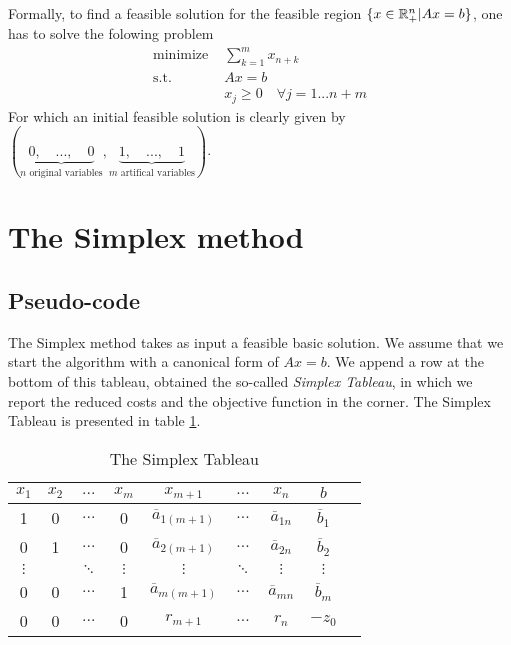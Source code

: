 Formally, to find a feasible solution for the feasible region  $\{ x\in\mathbb R^n_+ | Ax = b \}$, one has to solve the folowing problem 
\begin{align*}
    \textrm{minimize } & \sum_{k=1}^m x_{n+k}\\
    \textrm{s.t. } & Ax = b\\
    & x_j \ge 0\quad\forall j=1...n+m
\end{align*}
For which an initial feasible solution is clearly given by $(\underbrace{0,\quad...,\quad0}_{n\textrm{ original variables}},\underbrace{1,\quad...,\quad1}_{m\textrm{ artifical variables}})$. 

\section{The Simplex method}

\subsection{Pseudo-code}

The Simplex method takes as input a feasible basic solution. We assume that we start the algorithm with a canonical form of $Ax = b$. We append a row at the bottom of this tableau, obtained the so-called \textit{Simplex Tableau}, in which we report the reduced costs and the objective function in the corner. The Simplex Tableau is presented in table \ref{tab:simplex}. 
\begin{table}[h!]
    \centering
    \begin{tabular}{ccccccc|cc}
        $x_1$ & $x_2$ & $...$ & $x_m$ & $x_{m+1}$ & $...$ & $x_n$ & $b$ \\\hline
        1 & 0 & $...$ & 0 & $\overline a_{1(m+1)}$ & $...$ & $\overline a_{1n}$ & $\overline b_1$\\
        0 & 1 & $...$ & 0 & $\overline a_{2(m+1)}$ & $...$ & $\overline a_{2n}$ & $\overline b_2$\\
        $\vdots$ &  & $\ddots$ & $\vdots$ & $\vdots$ & $\ddots$ & $\vdots$ & $\vdots$  \\
        0 & 0 & $...$ & 1 & $\overline a_{m(m+1)}$ & $...$ & $\overline a_{mn}$ & $\overline b_m$\\\hline
        0 & 0 & $...$ & 0 & $r_{m+1}$ & $...$ & $r_n$ & $-z_0$
    \end{tabular}
    \caption{The Simplex Tableau}
    \label{tab:simplex}
\end{table}

